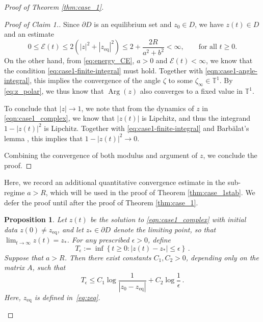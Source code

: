 \documentclass[10pt]{article}
\newtheorem{proposition}[theorem]{Proposition}
\theoremstyle{definition}
\theoremstyle{definition}
\numberwithin{equation}{section}
\newcommand{\BBT}{\mathbb{T}}
\newcommand{\CE}{\mathcal{E}}
\newcommand{\Arg}{\operatorname{Arg}}
\newcommand{\zeq}{z_{\mathrm{eq}}}
\begin{document}
\begin{proof}[Proof of Theorem \ref{thm:case_1}]
\begin{proof}[Proof of Claim 1.]
    Since $\partial D$ is an equilibrium set and $z_0 \in D$, we have $z(t) \in D$ and an estimate
    \begin{equation*}
    0 \leq \CE(t) \leq 2\left(|z|^2 + |\zeq|^2\right) \leq 2 + \frac{2R}{a^2 + b^2} < \infty, \qquad \text{for all } t \geq 0 .
    \end{equation*}
    On the other hand, from \eqref{eq:energy_CE}, $a > 0$ and $\CE(t) < \infty$, we know that the condition \eqref{eq:case1-finite-integral} must hold.
    Together with \eqref{eqn:case1-angle-integral}, this implies the convergence of the angle $\zeta$ to some $\zeta_{\infty} \in \BBT^1$. 
    By \eqref{eq:z_polar}, we thus know that $\Arg(z)$ also converges to a fixed value in $\BBT^1$.
    
    To conclude that $|z| \to 1$, we note that from the dynamics of $z$ in \eqref{eqn:case1_complex}, we know that $|z(t)|$ is Lipchitz, and thus the integrand $1 - |z(t)|^2$ is Lipchitz.  
    Together with \eqref{eq:case1-finite-integral} and Barb\u{a}lat's lemma \cite{Barbalat1959}, this implies that $1 - |z(t)|^2 \to 0$.

    Combining the convergence of both modulus and argument of $z$, we conclude the proof.
\end{proof}

Here, we record an additional quantitative convergence estimate in the sub-regime $a > R$, which will be used in the proof of Theorem \ref{thm:case_1stab}.
We defer the proof until after the proof of Theorem \ref{thm:case_1}.

\begin{proposition}\label{prop:case1_quantitative}
Let $z(t)$ be the solution to \eqref{eqn:case1_complex} with initial data $z(0) \neq \zeq$, and let $z_* \in \partial D$ denote the limiting point, so that $\lim_{t \rightarrow \infty} z(t) = z_*$.
For any prescribed $\epsilon > 0$, define
\begin{equation*}
    T_{\epsilon} := \inf \left\{ t \geq 0: |z(t) - z_*| \leq \epsilon \right\} \, .
\end{equation*}
Suppose that $a > R$. 
Then there exist constants $C_1, C_2 > 0$, depending only on the matrix $A$, such that
\begin{equation*}
T_{\epsilon} \leq C_1 \log \frac{1}{|z_0 - \zeq|} + C_2 \log \frac{1}{\epsilon} \, .
\end{equation*}
Here, $\zeq$ is defined in~\eqref{eq:zeq}.
\end{proposition}


\end{proof}
\end{document}
